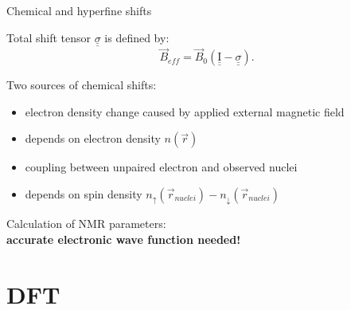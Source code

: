 \documentclass[slovene, usenames,dvipsnames]{beamer}
\begin{document}
\begin{frame}{Chemical and hyperfine shifts}

         \begin{definition}
 Total shift tensor $\underline{\underline{\sigma}}$ is defined by:
        \vspace*{-0.5\baselineskip}
        \centering
    \begin{equation} \nonumber
      \vec{B}_{eff}=\vec{B}_0\left( \underline{\underline{ \mathrm I }} - \underline{\underline{ \sigma}} \right).
    \end{equation}
  \end{definition}

  \centering Two sources of chemical shifts:
  
  \begin{minipage}[t]{0.5\textwidth}
    \begin{itemize}[]
     \item electron density change caused by applied external magnetic field
     \item depends on electron density $n(\vec r)$
      \end{itemize}
  \end{minipage}%
  \begin{minipage}[t]{0.5\textwidth}
    \begin{itemize}[]
      \item coupling between unpaired electron and observed nuclei
     \item depends on spin density $n_{\uparrow}(\vec r_{nuclei}) - n_{\downarrow}(\vec r_{nuclei})$
      \end{itemize}
    \end{minipage}
    Calculation of NMR parameters:\\ \bf{accurate electronic wave function needed!}
  \end{frame}

  \section{DFT}
\end{document}
